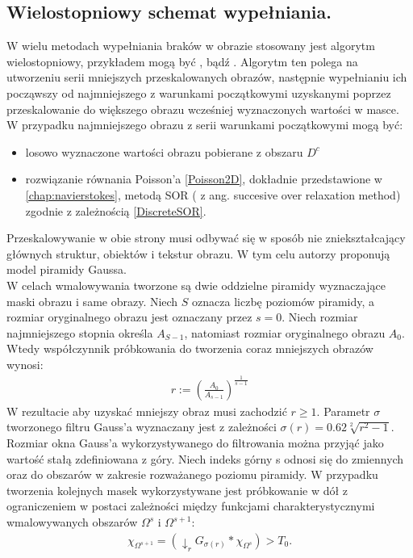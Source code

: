 \documentclass[12pt, twoside, openany]{report}
\theoremstyle{definition}
\begin{document}
\subsection{Wielostopniowy schemat wypełniania.}
W wielu metodach wypełniania braków w obrazie stosowany jest algorytm wielostopniowy, przykładem mogą być \cite{kawai2009image}, \cite{komodakis2007image} bądź \cite{wexler2007space}. Algorytm ten polega na utworzeniu serii mniejszych przeskalowanych obrazów, następnie wypełnianiu ich począwszy od najmniejszego z warunkami początkowymi uzyskanymi poprzez przeskalowanie do większego obrazu wcześniej wyznaczonych wartości w masce. W przypadku najmniejszego obrazu z serii warunkami początkowymi mogą być:
\begin{itemize}
\item
losowo wyznaczone wartości obrazu pobierane z obszaru $D^c$
\item
rozwiązanie równania Poisson'a \eqref{Poisson2D}, dokładnie przedstawione w \autoref{chap:navierstokes}, metodą SOR ( z ang. succesive over relaxation method) zgodnie z zależnością \eqref{DiscreteSOR}.
\end{itemize}
Przeskalowywanie w obie strony musi odbywać się w sposób nie zniekształcający głównych struktur, obiektów i tekstur obrazu. W tym celu autorzy \cite{arias2011variational} proponują model piramidy Gaussa.\\
W celach wmalowywania tworzone są dwie oddzielne piramidy wyznaczające maski obrazu i same obrazy. Niech $S$ oznacza liczbę poziomów piramidy, a rozmiar oryginalnego obrazu jest oznaczany przez $s=0$. Niech rozmiar najmniejszego stopnia określa $A_{S-1}$, natomiast rozmiar oryginalnego obrazu $A_{0}$. Wtedy współczynnik próbkowania do tworzenia coraz mniejszych obrazów wynosi:
\begin{align}
r := \left(\frac{A_0}{A_{s-1}}\right)^\frac{1}{s-1}
\end{align}
W rezultacie aby uzyskać mniejszy obraz musi zachodzić $r \geq 1$. Parametr $\sigma$ tworzonego filtru Gauss'a wyznaczany jest z zależności $\sigma(r)=0.62\sqrt[2]{r^2-1}$. Rozmiar okna Gauss'a wykorzystywanego do filtrowania można przyjąć jako wartość stałą zdefiniowana z góry. Niech indeks górny s odnosi się do zmiennych oraz do obszarów w zakresie rozważanego poziomu piramidy. W przypadku tworzenia kolejnych masek wykorzystywane jest próbkowanie w dół z ograniczeniem w postaci zależności między funkcjami charakterystycznymi wmalowywanych obszarów $\Omega^s$ i $\Omega^{s+1}$:
\begin{align}
\chi_{\Omega^{s+1}}=(\downarrow_r G_{\sigma(r)}\ast\chi_{\Omega^s})> T_{0}.
\end{align}
\end{document}
